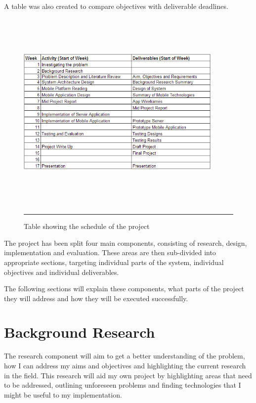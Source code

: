 A table was also created to compare objectives with deliverable deadlines.

\begin{figure}[htbp]
	\centering
\includegraphics[width=10cm,height=10cm,keepaspectratio]{Figures/projectplan.png}
		\rule{35em}{0.5pt}
	\caption[Table showing the schedule of the project]{Table showing the schedule of the project}
	\label{fig:projectplan}
\end{figure}

The project has been split four main components, consisting of research, design, implementation and evaluation. These areas are then sub-divided into appropriate sections, targeting individual parts of the system, individual objectives and individual deliverables.

The following sections will explain these components, what parts of the project they will address and how they will be executed successfully.


\section{Background Research}

The research component will aim to get a better understanding of the problem, how I can address my aims and objectives and highlighting the current research in the field. This research will aid my own project by highlighting areas that need to be addressed, outlining unforeseen problems and finding technologies that I might be useful to my implementation.

